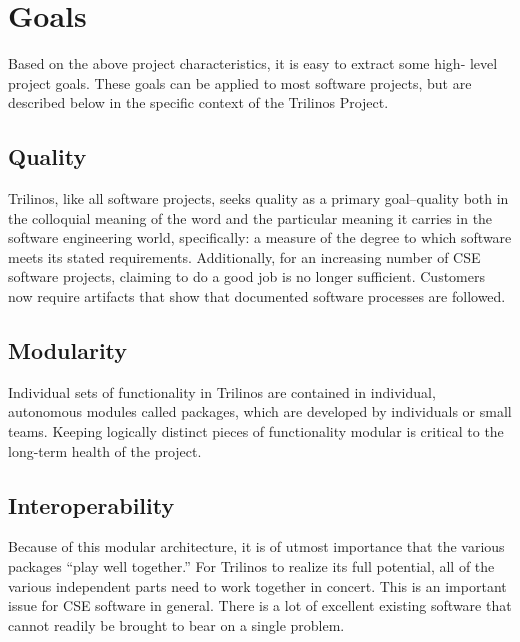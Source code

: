 \documentclass[12pt,relax]{article}
\begin{document}

\section{Goals}
\label{Section:Goals}

Based on the above project characteristics, it is easy to extract some high-
level project goals.  These goals can be applied to most software projects,
but are described below in the specific context of the Trilinos Project.

\subsection{Quality}
Trilinos, like all software projects, seeks quality as a primary goal--quality
both in the colloquial meaning of the word and the particular meaning it
carries in the software engineering world, specifically:  a measure of the
degree to which software meets its stated requirements.  Additionally, for an 
increasing number of CSE software projects, claiming to do a good job is no 
longer sufficient.  Customers now require artifacts that show that documented 
software processes are followed.

\subsection{Modularity}
Individual sets of functionality in Trilinos are contained in individual,
autonomous modules called packages, which are developed by individuals or small
teams.  Keeping logically distinct pieces of functionality modular is critical
to the long-term health of the project.  

\subsection{Interoperability}
Because of this modular architecture, it is of utmost importance that the
various packages ``play well together.''  For Trilinos to realize its full
potential, all of the various independent parts need to work together in
concert.  This is an important issue for CSE software in general.  There 
is a lot of excellent existing software that cannot readily be brought to
bear on a single problem.
\end{document}
